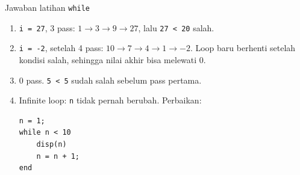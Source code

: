\documentclass[aspectratio=169,11pt]{beamer}
\begin{document}
\begin{frame}[fragile]{Jawaban latihan \texttt{while}}

\begin{enumerate}\small
  \item \texttt{i = 27}, 3 pass: $1 \to 3 \to 9 \to 27$, lalu
        \texttt{27 < 20} salah.
  \item \texttt{i = -2}, setelah 4 pass: $10 \to 7 \to 4 \to 1 \to -2$.
        Loop baru berhenti setelah kondisi salah, sehingga nilai akhir bisa
        melewati 0.
  \item 0 pass. \texttt{5 < 5} sudah salah sebelum pass pertama.
  \item Infinite loop: \texttt{n} tidak pernah berubah. Perbaikan:
\begin{lstlisting}[basicstyle=\ttfamily\scriptsize]
n = 1;
while n < 10
    disp(n)
    n = n + 1;
end
\end{lstlisting}
\end{enumerate}
\end{frame}
\end{document}
